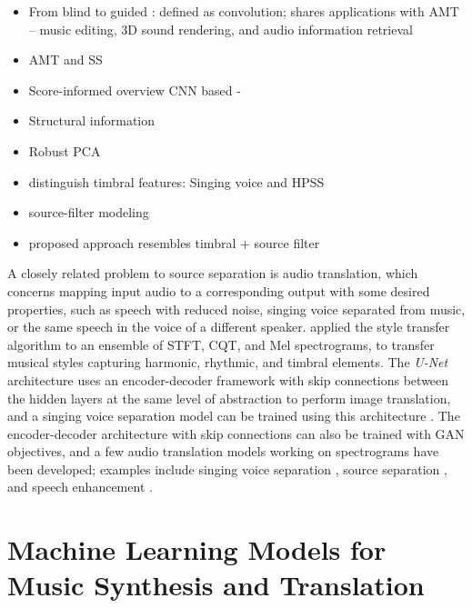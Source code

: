 \begin{itemize}
	\item From blind to guided \cite{vincent2013separation}: defined as convolution; shares applications with AMT -- music editing, 3D sound rendering, and audio information retrieval
	\item AMT and SS \cite{plumbley2002transcription}
	\item Score-informed overview \cite{ewert2014separation} CNN based - \cite{miron2017sourceseparation}
	\item Structural information \cite{rafii2013separation, liutkus2012separation}
	\item Robust PCA \cite{huang2012separation}
	\item distinguish timbral features: Singing voice \cite{li2007separation, jansson2017separation} and HPSS \cite{ono2010hpss}
	\item source-filter modeling \cite{ozerov2007separation,durrieu2011separation}
	\item proposed approach resembles timbral + source filter
\end{itemize}


A closely related problem to source separation is audio translation, which concerns mapping input audio to a corresponding output with some desired properties, such as speech with reduced noise, singing voice separated from music, or the same speech in the voice of a different speaker.
 applied the style transfer algorithm \cite{gatys2015style} to an ensemble of STFT, CQT, and Mel spectrograms, to transfer musical styles capturing harmonic, rhythmic, and timbral elements.
The \emph{U-Net} architecture \cite{ronneberger2015unet} uses an encoder-decoder framework with skip connections between the hidden layers at the same level of abstraction to perform image translation, and a singing voice separation model can be trained using this architecture \cite{jansson2017separation}.
The encoder-decoder architecture with skip connections can also be trained with GAN objectives, and a few audio translation models working on spectrograms have been developed; examples include singing voice separation \cite{fan2017svsgan, stoller2017separation}, source separation \cite{subakan2017gan}, and speech enhancement \cite{pascual2017segan, donahue2017segan}.



\section{Machine Learning Models for Music Synthesis and Translation}

